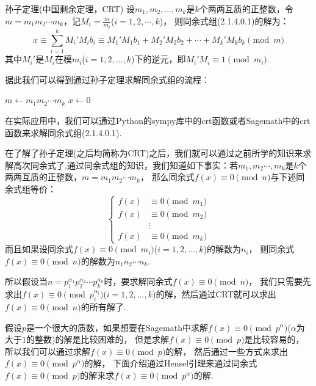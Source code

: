 \documentclass{book}
\numberwithin{equation}{subsubsection}
\begin{document}
\begin{concept}{孙子定理(中国剩余定理，CRT)}
设$m_1,m_2,\ldots,m_k$是$k$个两两互质的正整数，令$m=m_1m_2\cdots m_k$，记$M_i=\frac{m}{m_i}$($i=1,2,\cdots,k$)，
则同余式组(2.1.4.0.1)的解为：
\begin{equation}
    x\equiv \sum_{i=1}^{k}M_i'M_ib_i\equiv M_1'M_1b_1+M_2'M_2b_2+\cdots+M_k'M_kb_k\pmod{m}
    \nonumber
\end{equation}
其中$M_i'$是$M_i$在模$m_i$($i=1,2,\ldots,k$)下的逆元，即$M_i'M_i\equiv 1\pmod{m_i}$.\par
\end{concept}
据此我们可以得到通过孙子定理求解同余式组的流程：
\begin{algorithm}
    \caption{$\text{CRT}(b_1,b_2,\ldots,b_k;m_1,m_2,\ldots,m_k)$}
    $m\leftarrow m_1m_2\cdots m_k$
    $x\leftarrow 0$\\
\end{algorithm}\par
在实际应用中，我们可以通过Python的sympy库中的crt函数或者Sagemath中的crt函数来求解同余式组(2.1.4.0.1).\par
在了解了孙子定理(之后均简称为CRT)之后，我们就可以通过之前所学的知识来求解高次同余式了.通过同余式组的知识，我们知道如下事实：若$m_1,m_2\cdots,m_k$是$k$个两两互质的正整数，$m= m_1m_2\cdots m_k$，
那么同余式$f(x)\equiv 0\pmod{n}$与下述同余式组等价：
\begin{equation}
    \begin{cases}
        f(x)&\equiv 0\pmod{m_1}\\
        f(x)&\equiv 0\pmod{m_2}\\
        &\vdots\\
        f(x)&\equiv 0\pmod{m_k}
    \end{cases}
    \nonumber
\end{equation}
而且如果设同余式$f(x)\equiv 0\pmod{m_i}$($i=1,2,\ldots,k$)的解数为$n_i$，
则同余式$f(x)\equiv 0\pmod{n}$的解数为$n_1n_2\cdots n_k$.\par
所以假设当$n=p_1^{\alpha_1}p_2^{\alpha_2}\cdots p_k^{\alpha_k}$时，要求解同余式$f(x)\equiv 0\pmod{n}$，
我们只需要先求出$f(x)\equiv 0\pmod{p_i^{\alpha_i}}$($i=1,2,\ldots,k$)的解，然后通过CRT就可以求出$f(x)\equiv 0\pmod{n}$的所有解了.\par
假设$p$是一个很大的质数，如果想要在Sagemath中求解$f(x)\equiv 0\pmod{p^\alpha}$($\alpha$为大于$1$的整数)的解是比较困难的，
但是求解$f(x)\equiv 0\pmod{p}$是比较容易的，所以我们可以通过求解$f(x)\equiv 0\pmod{p}$的解，
然后通过一些方式来求出$f(x)\equiv 0\pmod{p^\alpha}$的解，
下面介绍通过Hensel引理来通过同余式$f(x)\equiv 0\pmod{p}$的解来求$f(x)\equiv 0\pmod{p^\alpha}$的解.\par
\end{document}
